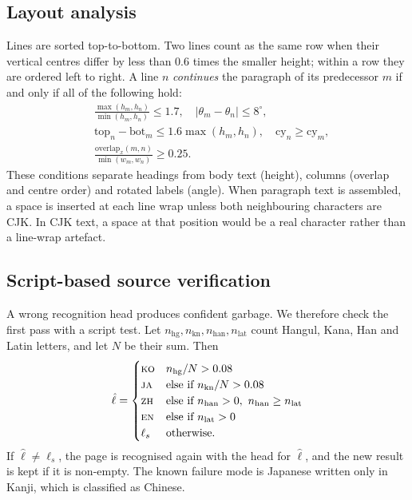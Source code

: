 \documentclass[journal]{IEEEtran}
\theoremstyle{definition}
\begin{document}
\subsection{Layout analysis}\label{sec:layout}
Lines are sorted top-to-bottom. Two lines count as the same row when their
vertical centres differ by less than $0.6$ times the smaller height; within a
row they are ordered left to right. A line $n$ \emph{continues} the paragraph
of its predecessor $m$ if and only if all of the following hold:
\begin{equation}
\begin{aligned}
 &\tfrac{\max(h_m,h_n)}{\min(h_m,h_n)}\le 1.7,\quad |\theta_m-\theta_n|\le 8^\circ,\\
 &\mathrm{top}_n-\mathrm{bot}_m\le 1.6\max(h_m,h_n),\quad \mathrm{cy}_n\ge \mathrm{cy}_m,\\
 &\frac{\mathrm{overlap}_x(m,n)}{\min(w_m,w_n)}\ge 0.25 .
\end{aligned}
\end{equation}
These conditions separate headings from body text (height), columns (overlap
and centre order) and rotated labels (angle). When paragraph text is
assembled, a space is inserted at each line wrap unless both neighbouring
characters are CJK. In CJK text, a space at that position would be a real
character rather than a line-wrap artefact.

\subsection{Script-based source verification}\label{sec:lid}
A wrong recognition head produces confident garbage. We therefore check the
first pass with a script test. Let $n_{\mathrm{hg}},n_{\mathrm{kn}},
n_{\mathrm{han}},n_{\mathrm{lat}}$ count Hangul, Kana, Han and Latin letters,
and let $N$ be their sum. Then
\begin{equation}
 \hat\ell=\begin{cases}
 \textsc{ko} & n_{\mathrm{hg}}/N>0.08\\
 \textsc{ja} & \text{else if } n_{\mathrm{kn}}/N>0.08\\
 \textsc{zh} & \text{else if } n_{\mathrm{han}}>0,\ n_{\mathrm{han}}\ge n_{\mathrm{lat}}\\
 \textsc{en} & \text{else if } n_{\mathrm{lat}}>0\\
 \ell_s & \text{otherwise.}
 \end{cases}
\end{equation}
If $\hat\ell\neq\ell_s$, the page is recognised again with the head for
$\hat\ell$, and the new result is kept if it is non-empty. The known failure
mode is Japanese written only in Kanji, which is classified as Chinese.
\end{document}
